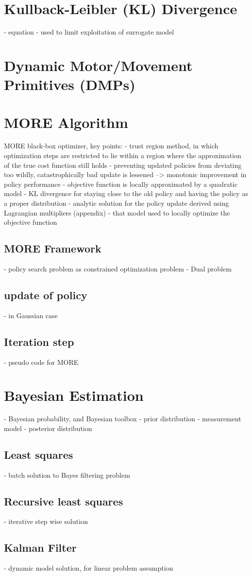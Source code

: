 \section{Kullback-Leibler (KL) Divergence}
- equation
- used to limit exploitation of surrogate model

\section{Dynamic Motor/Movement Primitives (DMPs)}

\section{MORE Algorithm}
MORE black-box optimizer, key points:
- trust region method, in which optimization steps are restricted to lie within a
region where the approximation of the true cost function still holds
- preventing updated policies from deviating too wildly, catastrophically bad
update is lessened --> monotonic improvement in policy performance
- objective function is locally approximated by a quadratic model
- KL divergence for staying close to the old policy and having the policy
as a proper distribution
- analytic solution for the policy update derived using Lagrangian multipliers
  (appendix)
- that model used to locally optimize the objective function

\subsection{MORE Framework}
- policy search problem as constrained optimization problem
- Dual problem

\subsection{update of policy}
- in Gaussian case

\subsection{Iteration step}
- pseudo code for MORE

\section{Bayesian Estimation}
- Bayesian probability, and Bayesian toolbox
  - prior distribution
  - measurement model
  - posterior distribution


\subsection{Least squares}
- batch solution to Bayes filtering problem

\subsection{Recursive least squares}
- iterative step wise solution

\subsection{Kalman Filter}
- dynamic model solution, for linear problem assumption